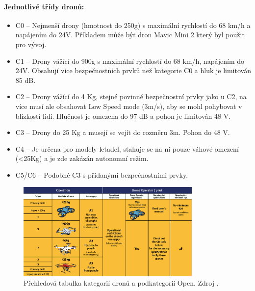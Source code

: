 \paragraph{Jednotlivé třídy dronů:}
\begin{itemize}
    \item C0 -- Nejmenší drony (hmotnost do 250g) s maximální rychlostí do 68 km/h a napájením do 24V. Příkladem může být dron Mavic Mini 2 který byl použit pro vývoj. 
    \item C1 -- Drony vážící do 900g s maximální rychlostí do 68 km/h, napájením do 24V. Obsahují více bezpečnostních prvků než kategorie C0 a hluk je limitován 85 dB.
    \item C2 -- Drony vážící do 4 Kg, stejné povinné bezpečnostní prvky jako u C2, na více musí ale obsahovat Low Speed mode (3m/s), aby se mohl pohybovat v blízkostí lidí. Hlučnost je omezena do 97 dB a pohon je limitován 48 V.
    \item C3 -- Drony do 25 Kg a musejí se vejít do rozměru 3m. Pohon do 48 V.
    \item C4 -- Je určena pro modely letadel, stahuje se na ní pouze váhové omezení (<25Kg) a je zde zakázán autonomní režim. 
    \item C5/C6 -- Podobné C3 s přidanými bezpečnostními prvky.
\end{itemize}


\begin{figure}[ht]
	\centering
	\includegraphics[width=0.81\textwidth]{obrazky-figures/drony/droneCatTable.png}
	\caption{Přehledová tabulka kategorií dronů a podkategorií Open.  Zdroj \cite{EASA:openSouhrn2024}.}
	\label{covpitDrLiner}
\end{figure}


